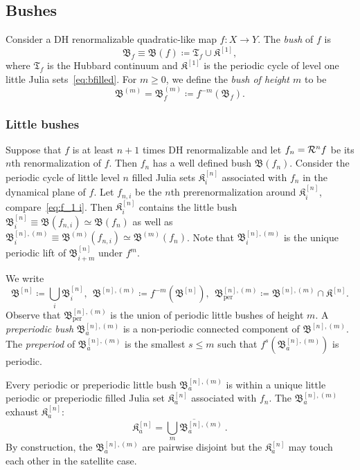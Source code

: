 \documentclass{amsart}
\newcommand{\bfilled}{{\boldsymbol{\mathfrak K} }}
\newcommand{\filled}{{\mathfrak K }}
\newcommand{\Hub}{{\mathfrak T}}
\newcommand{\per}{{\operatorname{per}}}
\newcommand{\bush}{{\mathfrak B }}
\newcommand{\bbush}{{\boldsymbol {\mathfrak B} }}
\renewcommand{\sp}{{\ \ }}
\newcommand{\1}{{\mathbb 1 }}
\begin{document}
\subsection{Bushes}\label{ss:bushes}
 Consider a DH renormalizable quadratic-like map $f\colon X\to Y$. The \emph{bush} of $f$ is 
\begin{equation}
\label{eq:dfn:bush}
\bush_f\equiv \bush(f)\coloneqq \Hub_f \cup  \bfilled^{[1]},
\end{equation}
where $\Hub_f$ is the Hubbard continuum and $\bfilled^{[1]}$ is the periodic cycle of level one little Julia sets~\eqref{eq:bfilled}. For $m \ge 0$, we define the \emph{bush of height $m$} to be 
\begin{equation}
\label{eq:dfn:bush:preim}
\bush^{(m)}=\bush^{(m)}_f\coloneqq f^{-m}(\bush_f).
\end{equation}


\subsubsection{Little bushes}\label{sss:LittleBushes}
Suppose that $f$ is at least $n+1$ times DH renormalizable and let $f_n={\mathcal R}^n f$ be its $n$th renormalization of $f$. Then $f_n$ has a well defined bush $\bush(f_n)$. Consider the periodic cycle of little level $n$ filled Julia sets $\filled_i^{[n]}$ associated with $f_n$ in the dynamical plane of $f$. Let $f_{n,i}$ be the $n$th prerenormalization around $\filled_i^{[n]}$, compare~\eqref{eq:f_1 i}. Then $\filled_i^{[n]}$ contains the little bush $\bush_i^{[n]}\equiv\bush(f_{n,i})\simeq \bush(f_n)$ as well as $\bush_i^{[n],(m)}\equiv\bush^{(m)}(f_{n,i})\simeq \bush^{(m)}(f_n)$. Note that $ \bush^{[n],(m)}_i$ is the unique periodic lift of $\bush_{i+m}^{[n]}$ under $f^{m}$.



We write
\[\bbush^{[n]}\coloneqq \bigcup_i \bush_i^{[n]}
,\sp  \bbush^{[n],(m)}\coloneqq f^{-m} \left(\bbush^{[n]}\right),\sp\bbush^{[n],(m)}_\per\coloneqq\bbush^{[n],(m)} \cap \bfilled^{[n]}.
\]
Observe that $\bbush^{[n],(m)}_\per$ is the union of periodic little bushes of height $m$. A \emph{preperiodic bush} $\bush^{[n],(m)}_a$ is a non-periodic connected component of $\bbush^{[n],(m)} $. The \emph{preperiod} of $\bush^{[n],(m)}_a$ is the smallest $s\le m$ such that $f^s \left( \bush^{[n],(m)}_a \right)$ is periodic.

 Every periodic or preperiodic little bush $\bush_{a}^{[n],(m)}$ is within a unique little periodic or preperiodic filled Julia set $\filled^{[n]}_a$ associated with $f_n$. The $\bush_{a}^{[n],(m)}$ exhaust $\filled^{[n]}_a$:
 \[\filled^{[n]}_a = \overline{\bigcup_{m} \bush^{[n],(m)}_a}\ .\] 
By construction, the $\bush^{[n],(m)}_a$ are pairwise disjoint but the $\filled^{[n]}_a$ may touch each other in the satellite case. 
\end{document}
